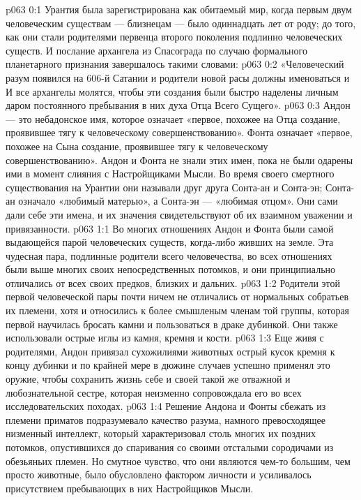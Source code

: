 \author{Носитель Жизни}
\vs p063 0:1 Урантия была зарегистрирована как обитаемый мир, когда первым двум человеческим существам --- близнецам --- было одиннадцать лет от роду; до того, как они стали родителями первенца второго поколения подлинно человеческих существ. И послание архангела из Спасограда по случаю формального планетарного признания завершалось такими словами:
\vs p063 0:2 «Человеческий разум появился на 606\hyp{}й Сатании и родители новой расы должны именоваться  и  И все архангелы молятся, чтобы эти создания были быстро наделены личным даром постоянного пребывания в них духа Отца Всего Сущего».
\vs p063 0:3 \pc Андон --- это небадонское имя, которое означает «первое, похожее на Отца создание, проявившее тягу к человеческому совершенствованию». Фонта означает «первое, похожее на Сына создание, проявившее тягу к человеческому совершенствованию». Андон и Фонта не знали этих имен, пока не были одарены ими в момент слияния с Настройщиками Мысли. Во время своего смертного существования на Урантии они называли друг друга Сонта\hyp{}ан и Сонта\hyp{}эн; Сонта\hyp{}ан означало «любимый матерью», а Сонта\hyp{}эн --- «любимая отцом». Они сами дали себе эти имена, и их значения свидетельствуют об их взаимном уважении и привязанности.
\vs p063 1:1 Во многих отношениях Андон и Фонта были самой выдающейся парой человеческих существ, когда\hyp{}либо живших на земле. Эта чудесная пара, подлинные родители всего человечества, во всех отношениях были выше многих своих непосредственных потомков, и они принципиально отличались от всех своих предков, близких и дальних.
\vs p063 1:2 Родители этой первой человеческой пары почти ничем не отличались от нормальных собратьев их племени, хотя и относились к более смышленым членам той группы, которая первой научилась бросать камни и пользоваться в драке дубинкой. Они также использовали острые иглы из камня, кремня и кости.
\vs p063 1:3 Еще живя с родителями, Андон привязал сухожилиями животных острый кусок кремня к концу дубинки и по крайней мере в дюжине случаев успешно применял это оружие, чтобы сохранить жизнь себе и своей такой же отважной и любознательной сестре, которая неизменно сопровождала его во всех исследовательских походах.
\vs p063 1:4 Решение Андона и Фонты сбежать из племени приматов подразумевало качество разума, намного превосходящее низменный интеллект, который характеризовал столь многих их поздних потомков, опустившихся до спаривания со своими отсталыми сородичами из обезьяньих племен. Но смутное чувство, что они являются чем\hyp{}то большим, чем просто животные, было обусловлено фактором личности и усиливалось присутствием пребывающих в них Настройщиков Мысли.
